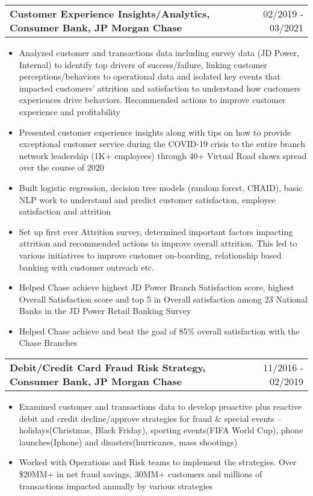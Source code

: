 \documentclass[a4paper,20pt]{article}
\makeatletter
\newcommand{\resumeSubheading}[2]{
  \vspace{1pt}\item
    \begin{tabular*}{0.97\textwidth}{l@{\extracolsep{\fill}}r}
      \textbf{#1} & #2 \\
    \end{tabular*}\vspace{1pt}
}
\makeatother
\begin{document}
\vspace{1pt}
     \resumeSubheading{Customer Experience Insights/Analytics, Consumer Bank, JP Morgan Chase}{02/2019 - 03/2021}
\begin{itemize}
\item {Analyzed customer and transactions data including survey data (JD Power, Internal) to identify top drivers of success/failure, linking customer perceptions/behaviors to operational data and isolated key events that impacted customers’ attrition and satisfaction to understand how customers experiences drive behaviors. Recommended actions to improve customer experience and profitability}
\vspace{1pt}
\item {Presented customer experience insights along with tips on how to provide exceptional customer service during the COVID-19 crisis to the entire branch network leadership (1K+ employees) through 40+ Virtual Road shows spread over the course of 2020}
\vspace{1pt}
\item {Built logistic regression, decision tree models (random forest, CHAID), basic NLP work to understand and predict customer satisfaction, employee satisfaction and attrition}
\vspace{1pt}
\item {Set up first ever Attrition survey, determined important factors impacting attrition and recommended actions to improve overall attrition. This led to various initiatives to improve customer on-boarding, relationship based banking with customer outreach etc.}
\vspace{1pt}
\item {Helped Chase achieve highest JD Power Branch Satisfaction score, highest Overall Satisfaction score and top 5 in Overall satisfaction among 23 National Banks in the JD Power Retail Banking Survey}
\vspace{1pt}
\item {Helped Chase achieve and beat the goal of 85\% overall satisfaction with the Chase Branches}
\end{itemize}


\vspace{1pt}
     \resumeSubheading{Debit/Credit Card Fraud Risk Strategy, Consumer Bank, JP Morgan Chase}{11/2016 - 02/2019}
\begin{itemize}
\item {Examined customer and transactions data to develop proactive plus reactive debit and credit decline/approve strategies for fraud \& special events – holidays(Christmas, Black Friday), sporting events(FIFA World Cup), phone launches(Iphone) and disasters(hurricanes, mass shootings)}
\item {Worked with Operations and Risk teams to implement the strategies. Over \$20MM+ in net fraud savings, 30MM+ customers and millions of transactions impacted annually by various strategies}
\end{itemize}
\end{document}
